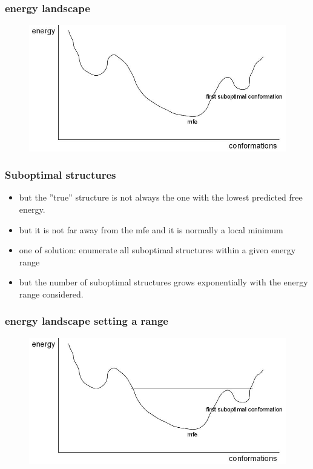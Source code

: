 \documentclass[ignorenonframetext,10pt]{beamer}
\begin{document}
\begin{frame}
\frametitle{energy landscape}
\begin{figure}
  \includegraphics[scale=0.4]{images/energy_landscape_simple.jpg}
\end{figure}
\end{frame}


\begin{frame}
\frametitle{Suboptimal structures}
  \begin{itemize} 
    \item but the ''true'' structure is not always the one with the lowest predicted free energy.
    \item but it is not far away from the mfe and it is normally a local minimum
    \item one of solution: enumerate all suboptimal structures within a given energy range
    \item but the number of suboptimal structures grows exponentially with the energy range considered.
  \end{itemize}
\end{frame}


\begin{frame}
\frametitle{energy landscape setting a range}  
\begin{figure}
  \includegraphics[scale=0.4]{images/energy_landscape_area.jpg} 
\end{figure}
\end{frame}
\end{document}
